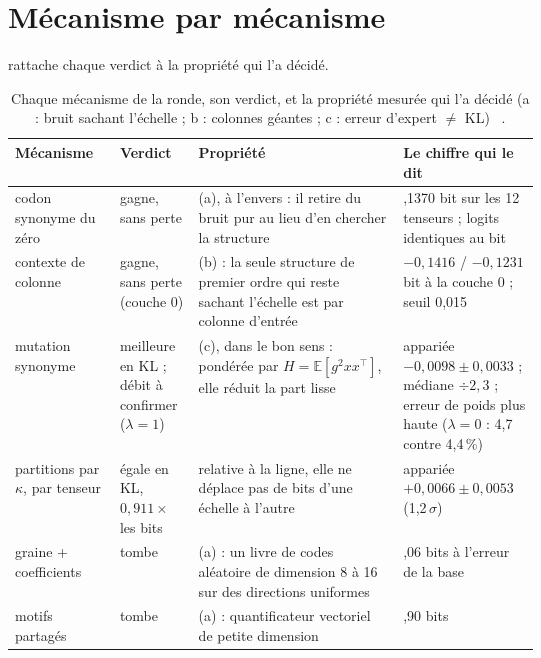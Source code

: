 \section{Mécanisme par mécanisme}\label{t3syn:sec:mecanismes}

 rattache chaque verdict à la propriété qui l'a décidé.

\begin{table}[p]
\centering\footnotesize
\caption[Chaque mécanisme et la propriété qui l'a décidé]{Chaque mécanisme de la ronde, son verdict, et la propriété mesurée qui l'a décidé (a : bruit sachant l'échelle ; b : colonnes géantes ; c : erreur d'expert $\ne$ KL) \mes~\calc.}
\label{t3syn:tab:mecanismes}
\renewcommand{\arraystretch}{1.12}
\begin{tabularx}{\linewidth}{@{}>{\raggedright\arraybackslash}p{0.2\linewidth}>{\raggedright\arraybackslash}p{0.15\linewidth}>{\raggedright\arraybackslash}X>{\raggedright\arraybackslash}p{0.26\linewidth}@{}}
\toprule
Mécanisme & Verdict & Propriété & Le chiffre qui le dit \\
\midrule
codon synonyme du zéro & gagne, sans perte & (a), à l'envers : il retire du bruit pur au lieu d'en chercher la structure & 0,1370 bit sur les 12 tenseurs ; logits identiques au bit \\
contexte de colonne & gagne, sans perte (couche 0) & (b) : la seule structure de premier ordre qui reste sachant l'échelle est par colonne d'entrée & $-0{,}1416$ / $-0{,}1231$ bit à la couche 0 ; seuil 0,015 \\
mutation synonyme & meilleure en KL ; débit à confirmer ($\lambda = 1$) & (c), dans le bon sens : pondérée par $H = \mathbb{E}[g^2 xx^{\top}]$, elle réduit la part lisse & appariée $-0{,}0098 \pm 0{,}0033$ ; médiane $\div 2{,}3$ ; erreur de poids plus haute ($\lambda = 0$ : 4,7 contre 4,4\,\%) \\
partitions par $\kappa$, par tenseur & égale en KL, $0{,}911 \times$ les bits & relative à la ligne, elle ne déplace pas de bits d'une échelle à l'autre & appariée $+0{,}0066 \pm 0{,}0053$ (1,2\,$\sigma$) \\
graine + coefficients & tombe & (a) : un livre de codes aléatoire de dimension 8 à 16 sur des directions uniformes & 3,06 bits à l'erreur de la base \\
motifs partagés & tombe & (a) : quantificateur vectoriel de petite dimension & 2,90 bits \\

\end{tabularx}
\end{table}
